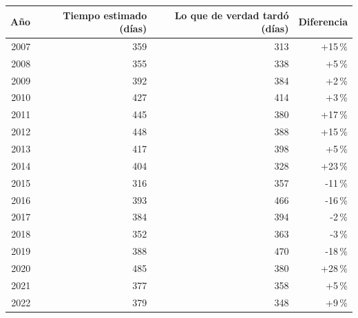 \begin{tabular}{rrrr}
\toprule
Año & Tiempo estimado (días) & Lo que de verdad tardó (días) & Diferencia \\
\midrule
2007 & 359 & 313 & +15\,\% \\
2008 & 355 & 338 & +5\,\% \\
2009 & 392 & 384 & +2\,\% \\
2010 & 427 & 414 & +3\,\% \\
2011 & 445 & 380 & +17\,\% \\
2012 & 448 & 388 & +15\,\% \\
2013 & 417 & 398 & +5\,\% \\
2014 & 404 & 328 & +23\,\% \\
2015 & 316 & 357 & -11\,\% \\
2016 & 393 & 466 & -16\,\% \\
2017 & 384 & 394 & -2\,\% \\
2018 & 352 & 363 & -3\,\% \\
2019 & 388 & 470 & -18\,\% \\
2020 & 485 & 380 & +28\,\% \\
2021 & 377 & 358 & +5\,\% \\
2022 & 379 & 348 & +9\,\% \\
\bottomrule
\end{tabular}
